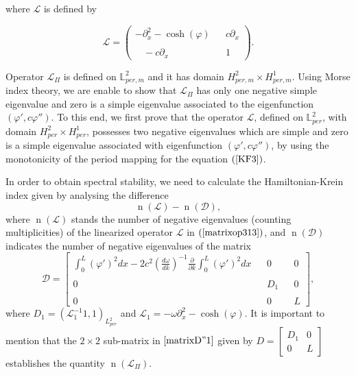 \documentclass[12pt,reqno,a4paper]{amsart} %
\numberwithin{equation}{section}
\numberwithin{figure}{section}
\begin{document}
\noindent where $\mathcal{L}$ is defined by

	\begin{equation}\label{matrixop313}
		\displaystyle \mathcal{L}=\left(
		\begin{array}{ccc}
		-\partial_x^2-\cosh(\varphi) & &c\partial_x\\\\
		\ \ \ \ -c\partial_x & & 1
		\end{array}\right).
	\end{equation}
	
\noindent	Operator $\mathcal{L}_{\Pi}$ is defined on $  \mathbb{L}_{per,m}^2$ and it has domain $H_{per,m}^2\times H_{per,m}^1$. Using Morse index theory, we are enable to show that $\mathcal{L}_{\Pi}$ has only one negative simple eigenvalue and zero is a simple eigenvalue associated to the eigenfunction $(\varphi',c\varphi'')$. To this end, we first prove that the operator $\mathcal{L}$, defined on $\mathbb{L}^2_{per} $, with domain $ H^2_{per} \times H^1_{per} $, possesses two negative eigenvalues which are simple and zero is a simple eigenvalue associated with eigenfunction $(\varphi',c\varphi'')$, by using the monotonicity of the period mapping for the equation $(\ref{KF3})$.
	
	 In order to obtain  spectral stability, we need to calculate the Hamiltonian-Krein index given by analysing the difference
	\begin{equation}\operatorname{n}(\mathcal{L})-\operatorname{n}(\mathcal{D}),
	\label{Kham}\end{equation}
	where $\operatorname{n}(\mathcal{L})$ stands the number of negative eigenvalues (counting multiplicities) of the linearized operator $\mathcal{L}$ in $(\ref{matrixop313})$, and $\operatorname{n}(\mathcal{D})$ indicates the number of negative eigenvalues of the matrix
	\begin{equation}\label{matrixD''1}
 	\mathcal{D}=\left[\begin{array}{llllll} \displaystyle \int_{0}^{L}(\varphi')^2dx-2c^2\left(\frac{d\omega}{dk}\right)^{-1}\frac{\partial}{\partial k}\int_{0}^{L}(\varphi')^2dx
 		& &  0& & 	 	0\\\\0& &D_1& & 0\\\\
 		0& & 0& & L\end{array}\right],
 \end{equation}
 where $D_1=(\mathcal{L}_{1}^{-1}1,1)_{L_{per}^2}$ and $\mathcal{L}_1=-\omega\partial_x^2-\cosh(\varphi)$. It is important to mention that the $2\times 2$ sub-matrix in $\eqref{matrixD''1}$ given by $D=\displaystyle\left[\begin{array}{cc}D_1&  0\\
 				0&  L\end{array}\right]$ establishes the quantity  $\operatorname{n}(\mathcal{L}_{\Pi})$.
 				
\end{document}
